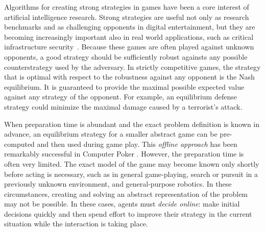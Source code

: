 \documentclass{aamas2015}
\newcounter{mlNoteCounter}
\newcommand{\mlnote}[1]{{\scriptsize \color{darkgreen} $\blacksquare$ \refstepcounter{mlNoteCounter}\textsf{[ML]$_{\arabic{mlNoteCounter}}$:{#1}}}}
\begin{document}
Algorithms for creating strong strategies in games have been a core interest of artificial intelligence research. Strong strategies are useful not only as research benchmarks and as challenging opponents in digital entertainment, but they are becoming increasingly important also in real world applications, such as critical infrastructure security~\cite{Tambe11}.
Because these games are often played against unknown opponents, a good strategy should be sufficiently robust againsts any possible counterstrategy used by the adversary. In strictly competitive games, the strategy that is optimal with respect to the robustness against any opponent is the Nash equilibrium. It is guaranteed to provide the maximal possible expected value against any strategy of the opponent. For example, an equilibrium defense strategy could minimize the maximal damage caused by a terrorist's attack.

When preparation time is abundant and the exact problem definition is known in advance, an equilibrium strategy for a smaller abstract game can be pre-computed and 
then used during game play. This {\it offline approach} has been remarkably successful in 
Computer Poker \cite{Sandholm10The,Rubin11Poker,Gilpin09,Johanson07Msc,Johanson13Evaluating}. 
However, the preparation time is often very limited. The exact model of the game may become known only shortly before acting is necessary, such as in general game-playing, search or pursuit in a previously unknown environment, and general-purpose robotics. In these circumstances, creating and solving an abstract representation of the problem may not be possible. In these cases, agents must {\it decide online}: make initial decisions quickly and then spend effort to improve their strategy in the current situation while the interaction is taking place.
\end{document}
